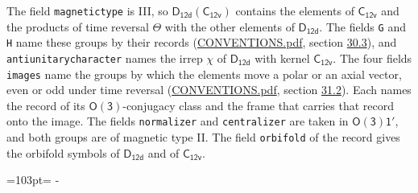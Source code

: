 \documentclass[10pt,a4paper]{article}
\newcommand{\needspace}[1]{\par\penalty-100\begingroup\dimen0=#1\relax\dimen2=\pagegoal
  \advance\dimen2-\pagetotal\ifdim\dimen0>\dimen2\relax\ifdim\dimen2>0pt\vfil\break\fi\fi
  \endgroup}
\numberwithin{equation}{section}
\newcommand{\grp}[1]{\mathsf{#1}}
\begin{document}
The field \texttt{magnetictype} is III, so $\grp{D_{12d}}(\grp{C_{12v}})$ contains the elements of $\grp{C_{12v}}$ and the products of time reversal $\varTheta$ with the other elements of $\grp{D_{12d}}$. The fields \texttt{G} and \texttt{H} name these groups by their records (\href{../../CONVENTIONS.pdf}{CONVENTIONS.pdf}, section \href{../../CONVENTIONS.pdf\#conv.30.3}{30.3}), and \texttt{antiunitarycharacter} names the irrep $\chi$ of $\grp{D_{12d}}$ with kernel $\grp{C_{12v}}$. The four fields \texttt{images} name the groups by which the elements move a polar or an axial vector, even or odd under time reversal (\href{../../CONVENTIONS.pdf}{CONVENTIONS.pdf}, section \href{../../CONVENTIONS.pdf\#conv.31.2}{31.2}). Each names the record of its $\grp{O(3)}$-conjugacy class and the frame that carries that record onto the image. The fields \texttt{normalizer} and \texttt{centralizer} are taken in $\grp{O(3)1'}$, and both groups are of magnetic type II. The field \texttt{orbifold} of the record gives the orbifold symbols of $\grp{D_{12d}}$ and of $\grp{C_{12v}}$.
\needspace{103pt}
\end{document}
